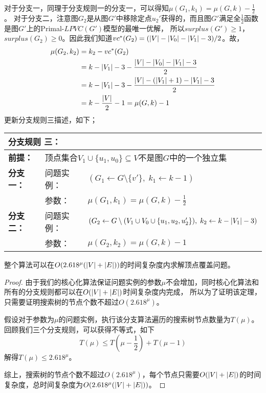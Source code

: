 对于分支一，同理于分支规则一的分支一，可以得知$\mu(G_1, k_1) = \mu(G, k) - \frac{1}{2}$。
对于分支二，注意图$G_2$是从图$G'$中移除定点$u_2'$获得的，而且图$G'$满足全$\frac{1}{2}$函数是图$G'$上的Primal-$LPVC(G')$模型的最唯一优解，
所以$surplus(G') \ge 1$，$surplus(G_2) \ge 0$。因此我们知道$vc^*(G_2) = (\left\vert V \right\vert - \left\vert V_0 \right\vert - \left\vert V_1 \right\vert - 3) / 2$。故，
\begin{equation*} \begin{aligned}
    \mu(G_2, k_2) & = k_2 - vc^*(G_2)  \\
                  & = k - \left\vert V_1 \right\vert - 3 - \frac{\left\vert V \right\vert - \left\vert V_0 \right\vert - \left\vert V_1 \right\vert - 3}{2} \\
                  & = k - \left\vert V_1 \right\vert - 3 - \frac{\left\vert V \right\vert - (\left\vert V_1 \right\vert + 1) - \left\vert V_1 \right\vert - 3}{2} \\
                  & = k - \frac{\left\vert V \right\vert}{2} - 1 = \mu(G, k) - 1
\end{aligned} \end{equation*}
更新分支规则三描述，如下；\\

\begin{tabular}{ p{0.12\headwidth} | p{0.12\headwidth}p{0.66\headwidth} }
  \multicolumn{3}{l}{ \textbf{分支规则 三：} }\\
  \hline
  \textbf{前提：}  & \multicolumn{2}{l}{顶点集合$V_1 \cup \{u_1, u_0\}\subseteq V$不是图$G$中的一个独立集}\\
  \hline
  \textbf{分支一：} & 问题实例：&$(G_1 \leftarrow G \setminus \{v'\},\; k_1 \leftarrow k - 1)$ \\
                    & 参数：&$\mu(G_1, k_1) = \mu(G, k) - \frac{1}{2}$\\
  \hline
  \textbf{分支二：} & 问题实例：&$(G_2 \leftarrow G \setminus (V_1\cup V_0  \cup \{u_1, u_2, u_2'\}) ,\; k_2 \leftarrow k - \left\vert V_1 \right\vert - 3)$\\
                    & 参数：&$\mu(G_2, k_2) = \mu(G, k) - 1$\\
  \hline
\end{tabular} \vspace{0.5cm}


\begin{theorem}
  整个算法可以在$O(2.618^{\mu}(\left\vert V \right\vert + \left\vert E \right\vert))$的时间复杂度内求解顶点覆盖问题。
\end{theorem}
\begin{proof}
  由于我们的核心化算法保证问题实例的参数$\mu$不会增加，同时核心化算法和所有的分支规则都可以在$O(\left\vert V \right\vert + \left\vert E \right\vert)$时间复杂度内完成，
  所以为了证明该定理，只需要证明搜索树的节点个数不超过$O(2.618^{\mu})$。

  假设对于参数为$\mu$的问题实例，执行该分支算法遍历的搜索树节点数量为$T(\mu)$。
  回顾我们三个分支规则，可以获得不等式，如下
  \[ T(\mu) \le T(\mu - \frac{1}{2}) + T(\mu - 1) \]
  解得$T(\mu) \le 2.618^{\mu}$。

  综上，搜索树的节点个数不超过$O(2.618^{\mu})$，每个节点只需要$O(\left\vert V \right\vert + \left\vert E \right\vert)$的时间复杂度，总时间复杂度为$O(2.618^{\mu}(\left\vert V \right\vert + \left\vert E \right\vert))$。
\end{proof}

